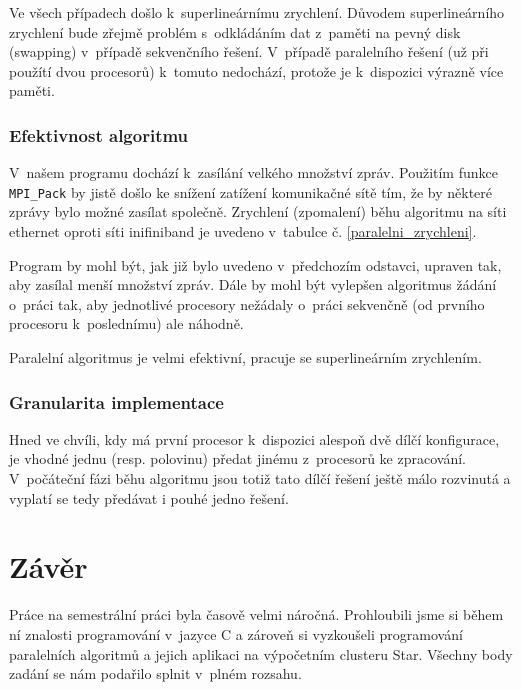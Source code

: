 \documentclass[12pt]{article}
\begin{document}
Ve všech případech došlo k~superlineárnímu zrychlení. Důvodem superlineárního zrychlení bude zřejmě problém s~odkládáním dat z~paměti na pevný disk (swapping) v~případě sekvenčního řešení. V~případě paralelního řešení (už při použítí dvou procesorů) k~tomuto nedochází, protože je k~dispozici výrazně více paměti.

\subsubsection{Efektivnost algoritmu}
V~našem programu dochází k~zasílání velkého množství zpráv. Použitím funkce \texttt{MPI\_Pack} by jistě došlo ke snížení zatížení komunikačné sítě tím, že by některé zprávy bylo možné zasílat společně. Zrychlení (zpomalení) běhu algoritmu na síti ethernet oproti síti inifiniband je uvedeno v~tabulce č. \ref{paralelni_zrychleni}.

Program by mohl být, jak již bylo uvedeno v~předchozím odstavci, upraven tak, aby zasílal menší množství zpráv. Dále by mohl být vylepšen algoritmus žádání o~práci tak, aby jednotlivé procesory nežádaly o~práci sekvenčně (od prvního procesoru k~poslednímu) ale náhodně.

Paralelní algoritmus je velmi efektivní, pracuje se superlineárním zrychlením. 

\subsubsection{Granularita implementace}

Hned ve chvíli, kdy má první procesor k~dispozici alespoň dvě dílčí konfigurace, je vhodné jednu (resp. polovinu) předat jinému z~procesorů ke zpracování. V~počáteční fázi běhu algoritmu jsou totiž tato dílčí řešení ještě málo rozvinutá a vyplatí se tedy předávat i pouhé jedno řešení.

\section{Závěr}

Práce na semestrální práci byla časově velmi náročná. Prohloubili jsme si během ní znalosti programování v~jazyce C a zároveň si vyzkoušeli programování paralelních algoritmů a jejich aplikaci na výpočetním clusteru Star. Všechny body zadání se nám podařilo splnit v~plném rozsahu.
\end{document}
